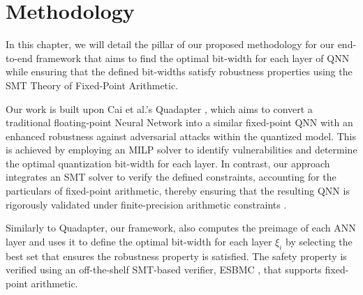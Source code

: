 \chapter{Methodology}\label{chap:methodology}

In this chapter, we will detail the pillar of our proposed methodology for our end-to-end framework that aims to find the optimal bit-width for each layer of QNN while ensuring that the defined bit-widths satisfy robustness properties using the SMT Theory of Fixed-Point Arithmetic.


Our work is built upon Cai et al.'s Quadapter \cite{cai2025certified}, which aims to convert a traditional floating-point Neural Network into a similar fixed-point QNN with an enhanced robustness against adversarial attacks within the quantized model. This is achieved by employing an MILP solver to identify vulnerabilities and determine the optimal quantization bit-width for each layer. In contrast, our approach integrates an SMT solver to verify the defined constraints, accounting for the particulars of fixed-point arithmetic, thereby ensuring that the resulting QNN is rigorously validated under finite-precision arithmetic constraints \cite{baranowski2020smt}.

Similarly to Quadapter, our framework, also computes the preimage of each ANN layer and uses it to define the optimal bit-width for each layer $\xi_{i}$ by selecting the best set that ensures the robustness property is satisfied. The safety property is verified using an off-the-shelf SMT-based verifier, ESBMC \cite{esbmc2025}, that supports fixed-point arithmetic.

